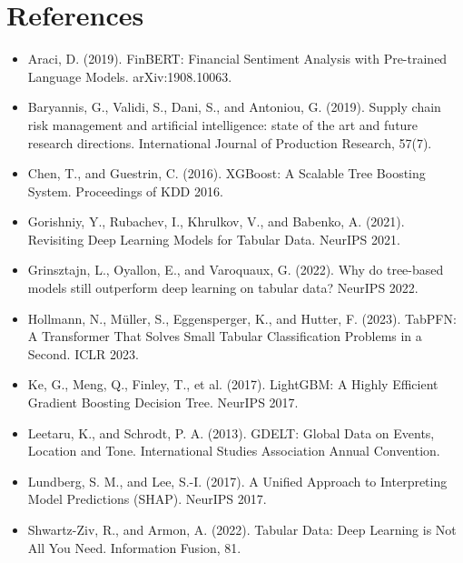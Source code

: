 \documentclass[11pt]{article}
\begin{document}
\section*{References}

\begin{itemize}[leftmargin=0pt, itemindent=1.5em, topsep=4pt, itemsep=6pt]
\item[] Araci, D. (2019). FinBERT: Financial Sentiment Analysis with Pre-trained Language Models. arXiv:1908.10063.
\item[] Baryannis, G., Validi, S., Dani, S., and Antoniou, G. (2019). Supply chain risk management and artificial intelligence: state of the art and future research directions. International Journal of Production Research, 57(7).
\item[] Chen, T., and Guestrin, C. (2016). XGBoost: A Scalable Tree Boosting System. Proceedings of KDD 2016.
\item[] Gorishniy, Y., Rubachev, I., Khrulkov, V., and Babenko, A. (2021). Revisiting Deep Learning Models for Tabular Data. NeurIPS 2021.
\item[] Grinsztajn, L., Oyallon, E., and Varoquaux, G. (2022). Why do tree-based models still outperform deep learning on tabular data? NeurIPS 2022.
\item[] Hollmann, N., M\"uller, S., Eggensperger, K., and Hutter, F. (2023). TabPFN: A Transformer That Solves Small Tabular Classification Problems in a Second. ICLR 2023.
\item[] Ke, G., Meng, Q., Finley, T., et al. (2017). LightGBM: A Highly Efficient Gradient Boosting Decision Tree. NeurIPS 2017.
\item[] Leetaru, K., and Schrodt, P. A. (2013). GDELT: Global Data on Events, Location and Tone. International Studies Association Annual Convention.
\item[] Lundberg, S. M., and Lee, S.-I. (2017). A Unified Approach to Interpreting Model Predictions (SHAP). NeurIPS 2017.
\item[] Shwartz-Ziv, R., and Armon, A. (2022). Tabular Data: Deep Learning is Not All You Need. Information Fusion, 81.
\end{itemize}
\end{document}
